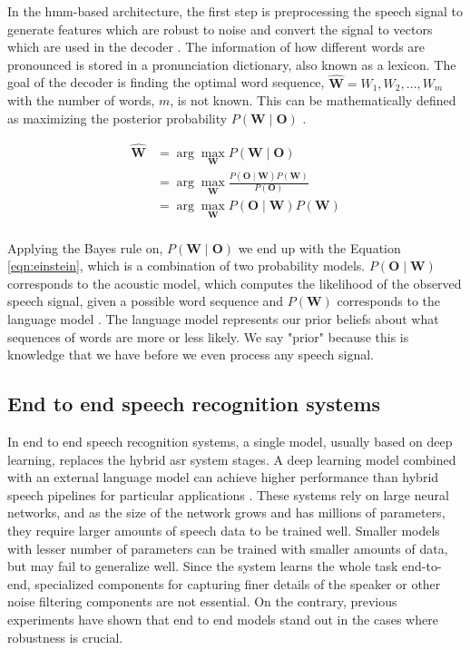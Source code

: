 In the \acrshort{hmm}-based architecture, the first step is preprocessing the speech signal to generate features which are robust to noise and convert the signal to vectors which are used in the decoder \cite{Mukhedkar2014RobustEnvironments}. The information of how different words are pronounced is stored in a pronunciation dictionary, also known as a lexicon. The goal of the decoder is finding the optimal word sequence, $\hat{\boldsymbol{W}}=W_{1}, W_{2}, \ldots, W_{m}$ with the number of words, $m$, is not known. This can be mathematically defined as maximizing the posterior probability $P(\boldsymbol{W} \mid \boldsymbol{O})$  \cite{Mansikkaniemi2010AcousticService}.

\begin{equation}
\begin{aligned}
\label{eqn:einstein} 
\hat{\boldsymbol{W}} &=\arg \max _{\boldsymbol{W}} P(\boldsymbol{W} \mid \boldsymbol{O}) \\
 &=\arg \max _{\boldsymbol{W}} \frac{P(\boldsymbol{O} \mid \boldsymbol{W}) P(\boldsymbol{W})}{P(\boldsymbol{O})} \\
 &=\arg \max _{\boldsymbol{W}} P(\boldsymbol{O} \mid \boldsymbol{W}) P(\boldsymbol{W}) 
\\ 
\end{aligned}
\end{equation}

Applying the Bayes rule on, $P(\boldsymbol{W} \mid \boldsymbol{O})$ we end up with the Equation \ref{eqn:einstein}, which is a combination of two probability models. $P(\boldsymbol{O} \mid \boldsymbol{W})$ corresponds to the acoustic model,  which computes the likelihood of the observed speech signal, given a possible word sequence and $P(\boldsymbol{W})$ corresponds to the language model \cite{Ney1999DynamicRecognition}. The language model represents our prior beliefs about what sequences of words are more or less likely. We say "prior" because this is knowledge that we have before we even process any speech signal. 


\subsection{End to end speech recognition systems}
\label{section:e2easr}
In end to end speech recognition systems, a single model, usually based on deep learning, replaces the hybrid \acrshort{asr} system stages. A deep learning model combined with an external language model can achieve higher performance than hybrid speech pipelines for particular applications \cite{Deshmukh2020ComparisonRecognition}. These systems rely on large neural networks, and as the size of the network grows and has millions of parameters, they require larger amounts of speech data to be trained well. Smaller models with lesser number of parameters can be trained with smaller amounts of data, but may fail to generalize well\cite{Tanaka2021End-to-EndLearning}. Since the system learns the whole task end-to-end, specialized components for capturing finer details of the speaker or other noise filtering components are not essential. On the contrary, previous experiments have shown that end to end models stand out in the cases where robustness is crucial\cite{Hannun2014DeepRecognition}. 


